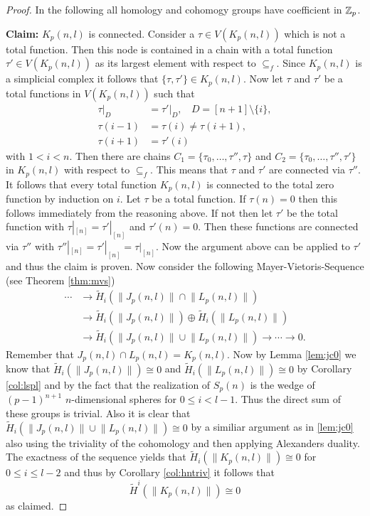 \begin{proof}
  In the following all homology and cohomogy groups have coefficient in $\mathbb{Z}_p$.

  \textbf{Claim:} $K_p(n,l)$ is connected. Consider a $\tau \in V(K_p(n,l))$ which is not a total function. Then this node is contained in a chain with a total function $\tau' \in V(K_p(n,l))$ as its largest element with respect to $\subseteq_f$. Since $K_p(n,l)$ is a simplicial complex it follows that $\{\tau, \tau'\} \in K_p(n,l)$.
  Now let $\tau$ and $\tau'$ be a total functions in $V(K_p(n,l))$ such that
  \begin{align*}
    \tau|_D &= \tau'|_D, \:\:\:\: D = [n+1]\setminus \{i\}, \\
    \tau(i-1) &= \tau(i) \neq \tau(i+1), \\
    \tau(i+1) &= \tau'(i)
  \end{align*}
  with $1 < i < n$.
  Then there are chains $C_1 = \{\tau_0, \ldots, \tau'', \tau\}$ and $C_2 = \{\tau_0, \ldots, \tau'', \tau' \}$ in $K_p(n,l)$ with respect to $\subseteq_f$. This means that $\tau$ and $\tau'$ are connected via $\tau''$.
  It follows that every total function $K_p(n,l)$ is connected to the total zero function by induction on $i$. Let $\tau$ be a total function. If $\tau(n) = 0$ then this follows immediately from the reasoning above. If not then let $\tau'$ be the total function with $\tau|_{[n]} = \tau'|_{[n]}$ and $\tau'(n) = 0$. Then these functions are connected via $\tau''$ with $\tau''|_{[n]} = \tau'|_{[n]} = \tau|_{[n]}$. Now the argument above can be applied to $\tau'$ and thus the claim is proven.
  Now consider the following Mayer-Vietoris-Sequence (see Theorem \ref{thm:mvs})
  \begin{align*}
    \label{eq:mayvietk}
    \cdots &\to \tilde{H}_i(\lVert J_p(n,l) \rVert \cap \lVert L_p(n,l)\rVert) \\ &\to \tilde{H}_i(\lVert J_p(n,l)\rVert) \oplus \tilde{H}_i(\lVert L_p(n,l) \rVert) \\ &\to \tilde{H}_i(\lVert J_p(n,l)\rVert \cup \lVert L_p(n,l) \rVert) \to \cdots \to 0.
  \end{align*}
  Remember that $J_p(n,l) \cap L_p(n,l) = K_p(n,l)$. Now by Lemma \ref{lem:jc0} we know that $\tilde{H}_i(\lVert J_p(n,l)\rVert) \cong 0$ and $\tilde{H}_i(\lVert L_p(n,l)\rVert) \cong 0$ by Corollary \ref{col:lspl} and by the fact that the realization of $S_p(n)$ is the wedge of $(p-1)^{n+1}$ $n$-dimensional spheres for $0 \leq i < l-1$. Thus the direct sum of these groups is trivial. Also it is clear that $\tilde{H}_i(\lVert J_p(n,l)\rVert \cup \lVert L_p(n,l)\rVert) \cong 0$ by a similiar argument as in \ref{lem:jc0} also using the triviality of the cohomology and then applying Alexanders duality. The exactness of the sequence yields that $\tilde{H}_i(\lVert K_p(n,l)\rVert) \cong 0$ for $0 \leq i \leq l-2$ and thus by Corollary \ref{col:hntriv} it follows that \[\tilde{H}^i(\lVert K_p(n,l)\rVert) \cong 0\] as claimed.
\end{proof}
